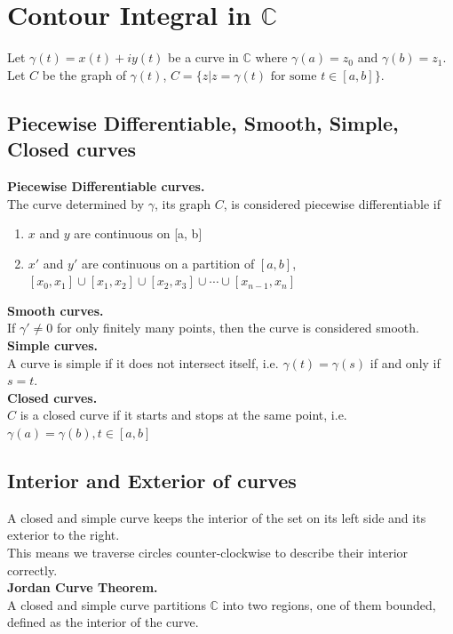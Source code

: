 \documentclass[11pt]{article}
\begin{document}
\newpage
\section{Contour Integral in $\mathbb{C}$}
Let $\gamma(t) = x(t) + iy(t)$ be a curve in $\mathbb{C}$ where $\gamma(a) = z_0$ and $\gamma(b) = z_1$. \\
Let $C$ be the graph of $\gamma(t)$, $C = \{z | z = \gamma(t) \mbox{ for some } t \in [a, b] \}$. 
\subsection{Piecewise Differentiable, Smooth, Simple, Closed curves}
\textbf{Piecewise Differentiable curves.} \\
The curve determined by $\gamma$, its graph $C$, is considered piecewise differentiable if 
\begin{enumerate}
\item $x$ and $y$ are continuous on [a, b]
\item $x'$ and $y'$ are continuous on a partition of $[a, b]$, $[x_0, x_1] \cup [x_1, x_2] \cup [x_2, x_3] \cup \cdots \cup [x_{n - 1}, x_n]$
\end{enumerate} 

\textbf{Smooth curves.} \\
If $\gamma' \neq 0$ for only finitely many points, then the curve is considered smooth. \\

\textbf{Simple curves.} \\
A curve is simple if it does not intersect itself, i.e. $\gamma(t) = \gamma(s)$ if and only if $s = t$. \\

\textbf{Closed curves.} \\
$C$ is a closed curve if it starts and stops at the same point, i.e. $\gamma(a) = \gamma(b), t \in [a, b]$ 

\subsection{Interior and Exterior of curves} 
A closed and simple curve keeps the interior of the set on its left side and its exterior to the right. \\
This means we traverse circles counter-clockwise to describe their interior correctly. \\
\newline
\textbf{Jordan Curve Theorem.} \\
A closed and simple curve partitions $\mathbb{C}$ into two regions, one of them bounded, defined as the interior of the curve. 
\end{document}
